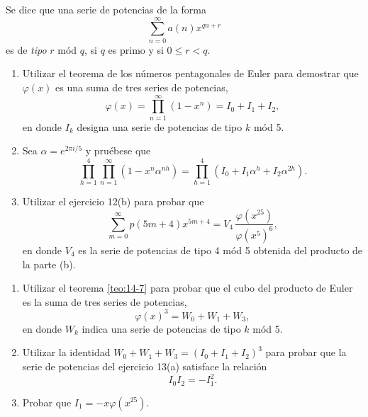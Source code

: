\documentclass[12pt,a4paper]{book}
\begin{document}
    \begin{ejercicio}
        Se dice que una serie de potencias de la forma
        \begin{equation*}
            \sum_{n=0}^{\infty}a(n)x^{qn+r}
        \end{equation*}
        es de \textit{tipo} $r$ mód $q$, si $q$ es primo y si $0\leq r<q$.
        \begin{enumerate}
            \item[(a)] Utilizar el teorema de los números pentagonales de Euler para demostrar
            que $\varphi(x)$ es una suma de tres series de potencias,
            \begin{equation*}
                \varphi(x)=\prod_{n=1}^{\infty}(1-x^{n})=I_{0}+I_{1}+I_{2},
            \end{equation*}
            en donde $I_{k}$ designa una serie de potencias de tipo $k$ mód 5.
            \item[(b)] Sea $\alpha=e^{2\pi i/5}$ y pruébese que
            \begin{equation*}
                \prod_{h=1}^{4}\prod_{n=1}^{\infty}(1-x^{n}\alpha^{nh})=\prod_{h=1}^{4}(I_{0}+I_{1}\alpha^{h}+I_{2}\alpha^{2h}).
            \end{equation*}
            \item[(c)] Utilizar el ejercicio 12(b) para probar que
            \begin{equation*}
                \sum_{m=0}^{\infty}p(5m+4)x^{5m+4}=V_{4}\,\frac{\varphi(x^{25})}{\varphi(x^{5})^{6}},
            \end{equation*}
            en donde $V_{4}$ es la serie de potencias de tipo 4 mód 5 obtenida del producto de la
            parte (b).
        \end{enumerate}
    \end{ejercicio}

    \begin{ejercicio}
        \begin{enumerate}
            \item[(a)] Utilizar el teorema \ref{teo:14-7} para probar que el cubo del producto
            de Euler es la suma de tres series de potencias,
            \begin{equation*}
                \varphi(x)^{3}=W_{0}+W_{1}+W_{3},
            \end{equation*}
            en donde $W_{k}$ indica una serie de potencias de tipo $k$ mód 5.
            \item[(b)] Utilizar la identidad $W_{0}+W_{1}+W_{3}=(I_{0}+I_{1}+I_{2})^{3}$ para probar que la
            serie de potencias del ejercicio 13(a) satisface la relación
            \begin{equation*}
                I_{0}I_{2}=-I_{1}^{2}.
            \end{equation*}
            \item[(c)] Probar que $I_{1}=-x\varphi(x^{25})$.
        \end{enumerate}
    \end{ejercicio}
\end{document}

